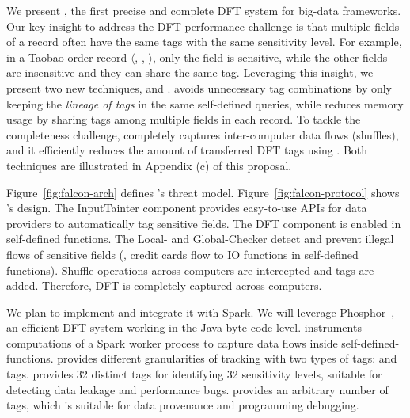 We present \kakute, the first precise and complete DFT system for big-data 
frameworks. Our key insight to address the DFT performance challenge is that 
multiple fields of a record often have the same tags with the same sensitivity 
level. For example, in a Taobao order record $\langle$, 
, $\rangle$, only the  field is 
sensitive, while the other fields are insensitive and they can share the same 
tag. Leveraging this insight, we present two new techniques, \lazyp and 
\tagcache. \lazyp avoids unnecessary tag combinations by only keeping the 
\textit{lineage of tags} in the same self-defined queries, while \tagcache 
reduces memory usage by sharing tags among multiple fields in each record. To 
tackle the completeness challenge, \kakute completely captures inter-computer 
data flows (shuffles), and it efficiently reduces the amount of 
transferred DFT tags using \tagcache. Both techniques are illustrated in 
Appendix (c) of this proposal.

Figure~\ref{fig:falcon-arch} defines \kakute's threat 
model. Figure~\ref{fig:falcon-protocol} shows \kakute's design. The 
InputTainter component provides easy-to-use APIs for data providers to 
automatically tag sensitive fields. The DFT component is enabled in 
self-defined functions. The Local- and Global-Checker detect and 
prevent illegal flows of sensitive fields (\eg, credit cards flow to IO 
functions in self-defined functions). Shuffle operations across computers are 
intercepted and tags are added. Therefore, DFT is completely captured across 
computers.

We plan to implement \kakute and integrate it with Spark. We will leverage 
Phosphor~\cite{oo14:phosphor}, an efficient DFT system working in the Java 
byte-code level. \kakute instruments computations of a Spark worker process
to capture data flows inside self-defined-functions. \kakute provides different 
granularities of tracking with two types of tags: 
and  tags.  provides 32 distinct tags for 
identifying 32 sensitivity levels, suitable for detecting data leakage and 
performance bugs.  provides an arbitrary number of tags, which is 
suitable for data provenance and programming debugging.

